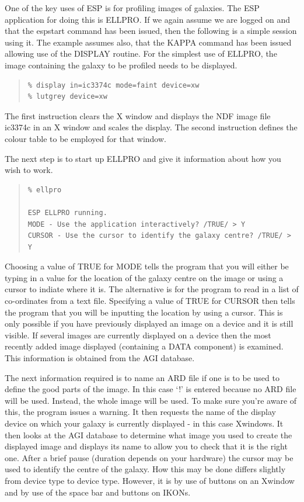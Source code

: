 \documentclass[twoside,11pt]{article}
\newcommand{\xref}[3]{#1}
\newenvironment{myquote}{\begin{quote}\begin{small}}{\end{small}\end{quote}}
\begin{document}
One of the key uses of ESP is for profiling images of galaxies.
The ESP application for doing this is ELLPRO. If we again assume we
are logged on and that the espstart command has been issued,
then the following is a simple session using it. The example 
assumes also, that the \xref{KAPPA}{sun95}{} command has been issued allowing use of the
DISPLAY routine. For the simplest use of ELLPRO, the image containing
the galaxy to be profiled needs to be displayed.

\begin{myquote}
\begin{verbatim}
% display in=ic3374c mode=faint device=xw 
% lutgrey device=xw
\end{verbatim}
\end{myquote}

The first instruction clears the X window and displays the NDF image file 
ic3374c in an X window and scales the display. The second instruction defines 
the colour table to be employed for that window. 

The next step is to start up ELLPRO and give it information about how
you wish to work. 

\begin{myquote}
\begin{verbatim}
% ellpro

ESP ELLPRO running.
MODE - Use the application interactively? /TRUE/ > Y
CURSOR - Use the cursor to identify the galaxy centre? /TRUE/ > Y
\end{verbatim}
\end{myquote}
 
Choosing a value of TRUE for MODE tells the program that you will
either be typing in a value for the location of the galaxy centre on the image
or using a cursor to indiate where it is. The alternative is for the program to
read in a list of co-ordinates from a text file. Specifying a value of TRUE
for CURSOR then tells the program that you will be inputting the location by
using a cursor. This is only possible if you have previously displayed an
image on a device and it is still visible. If several images are currently
displayed on a device then the most recently added image displayed 
(containing a DATA component) is examined. This information is obtained from
the AGI database.

The next information required is to name an ARD file if one is to be used to
define the good parts of the image. In this case `!' is entered because no
ARD file will be used. Instead, the whole image will be used. To make sure
you're aware of this, the program issues a warning. It then requests the
name of the display device on which your galaxy is currently displayed - 
in this case Xwindows. It then looks at the AGI database to determine 
what image you used to create the displayed image and displays its name
to allow you to check that it is the right one. After a brief pause
(duration depends on your hardware) the cursor may be used to identify the
centre of the galaxy. How this may be done differs slightly from device type to
device type. However, it is by use of buttons on an Xwindow and by use
of the space bar and buttons on IKONs.
\end{document}
